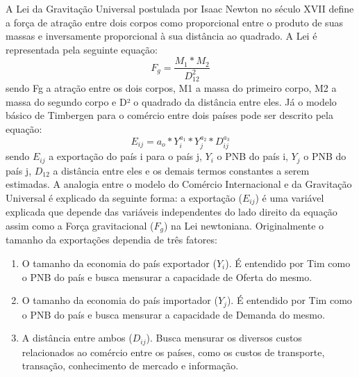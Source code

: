 \documentclass[12pt]{article}
\begin{document}
A Lei da Gravitação Universal postulada por Isaac Newton no século XVII define a força de atração entre dois corpos como proporcional entre o produto de suas massas e inversamente proporcional à sua distância ao quadrado. A Lei é representada pela seguinte equação: \[F_g =\frac{M_1 * M_2}{D_{12} ^2}\] sendo Fg a atração entre os dois corpos, M1 a massa do primeiro corpo, M2 a massa do segundo corpo e D² o quadrado da distância entre eles. Já o modelo básico de Timbergen para o comércio entre dois países pode ser descrito pela equação: \[E_{ij} = a_o * Y_i ^{a_1} * Y_j ^ {a_2} * D_{ij} ^ {a_3}\] sendo $E_{ij}$ a exportação do país i para o país j, $Y_i$ o PNB do país i, $Y_j$ o PNB do país j, $D_{12}$ a distância entre eles e os demais termos constantes a serem estimadas. A analogia entre o modelo do Comércio Internacional e da Gravitação Universal é explicado da seguinte forma: a exportação ($E_{ij}$) é uma variável explicada que depende das variáveis independentes do lado direito da equação assim como a Força gravitacional ($F_g$) na Lei newtoniana. Originalmente o tamanho da exportações dependia de três fatores: \begin{enumerate}
\item O tamanho da economia do país exportador ($Y_i$). É entendido por Tim como o PNB do país e busca mensurar a capacidade de Oferta do mesmo.  
\item O tamanho da economia do país importador ($Y_j$). É entendido por Tim como o PNB do país e busca mensurar a capacidade de Demanda do mesmo.
\item A distância entre ambos ($D_{ij}$). Busca mensurar os diversos custos relacionados ao comércio entre os países, como os custos de transporte, transação, conhecimento de mercado e informação.
\end{enumerate} 
\end{document}
